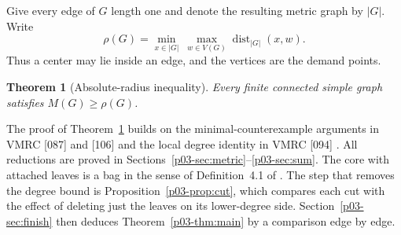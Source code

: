 \documentclass[11pt,a4paper]{article}
\newtheorem{theorem}{Theorem}[section]
\newcommand{\dist}{\operatorname{dist}}\newcommand{\ecc}{\operatorname{ecc}}
\begin{document}
Give every edge of $G$ length one and denote the resulting metric graph
by $|G|$. Write
\[
 \rho(G)=\min_{x\in|G|}\ \max_{w\in V(G)}\dist_{|G|}(x,w).
\]
Thus a center may lie inside an edge, and the vertices are the demand points.
\begin{theorem}[Absolute-radius inequality]\label{p03-thm:abs}
Every finite connected simple graph satisfies $M(G)\ge\rho(G)$.
\end{theorem}
The proof of Theorem~\ref{p03-thm:abs} builds on the minimal-counterexample
arguments in VMRC [087] and [106] and the local degree identity in
VMRC [094] \cite{p03-VMRC}. All reductions are proved in
Sections~\ref{p03-sec:metric}--\ref{p03-sec:sum}. The core with attached leaves
is a bag in the sense of Definition~4.1 of \cite{p03-CPS}. The step that
removes the degree
bound is Proposition~\ref{p03-prop:cut}, which compares each cut with the effect
of deleting just the leaves on its lower-degree side. Section~\ref{p03-sec:finish}
then deduces Theorem~\ref{p03-thm:main} by a comparison edge by edge.
\end{document}
